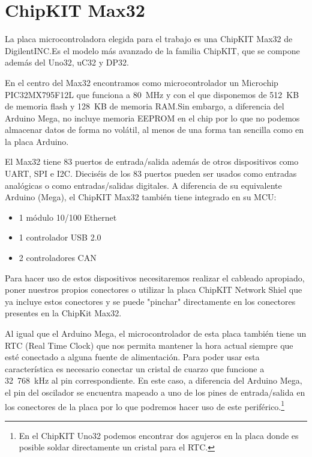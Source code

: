 \section{ChipKIT Max32}
La placa microcontroladora elegida para el trabajo es una ChipKIT Max32 de DigilentINC.\@ Es el modelo más avanzado de la familia ChipKIT, que se compone además del Uno32, uC32 y DP32.


En el centro del Max32 encontramos como microcontrolador un Microchip PIC32MX795F12L que funciona a 80~MHz y con el que disponemos de 512~KB de memoria flash y 128~KB de memoria RAM.\@ Sin embargo, a diferencia del Arduino Mega, no incluye memoria EEPROM en el chip por lo que no podemos almacenar datos de forma no volátil, al menos de una forma tan sencilla como en la placa Arduino. 

El Max32 tiene 83 puertos de entrada/salida además de otros dispositivos como UART, SPI e I2C. Dieciséis de los 83 puertos pueden ser usados como entradas analógicas o como entradas/salidas digitales. A diferencia de su equivalente Arduino (Mega), el ChipKIT Max32 también tiene integrado en su MCU:
\begin{itemize}
 \item 1 módulo 10/100 Ethernet
 \item 1 controlador USB 2.0
 \item 2 controladores CAN 
 \end{itemize} 
 
Para hacer uso de estos dispositivos necesitaremos realizar el cableado apropiado, poner nuestros propios conectores o utilizar la placa ChipKIT Network Shiel que ya incluye estos conectores y se puede "pinchar" directamente en los conectores presentes en la ChipKit Max32. 

Al igual que el Arduino Mega, el microcontrolador de esta placa también tiene un RTC (Real Time Clock) que nos permita mantener la hora actual siempre que esté conectado a alguna fuente de alimentación. Para poder usar esta característica es necesario conectar un cristal de cuarzo que funcione a 32~768~kHz al pin correspondiente. En este caso, a diferencia del Arduino Mega, el pin del oscilador se encuentra mapeado a uno de los pines de entrada/salida en los conectores de la placa por lo que podremos hacer uso de este periférico.\footnote{En el ChipKIT Uno32 podemos encontrar dos agujeros en la placa donde es posible soldar directamente un cristal para el RTC.}

